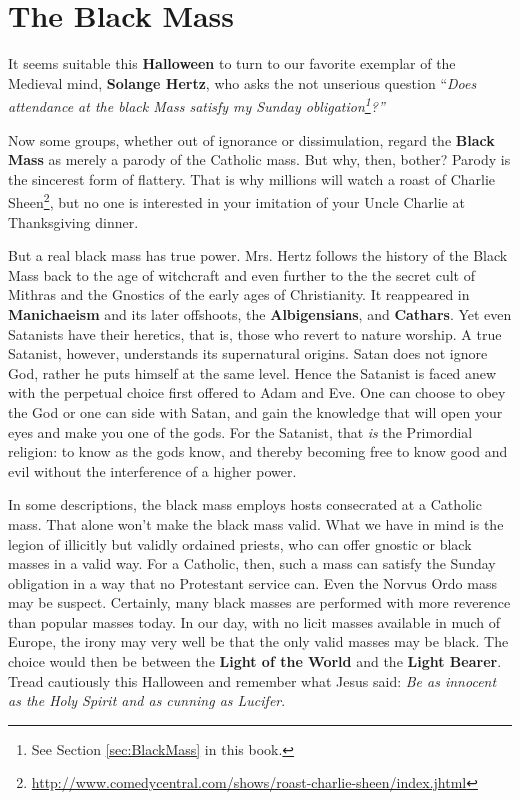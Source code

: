 \section{The Black Mass}

It seems suitable this \textbf{Halloween} to turn to our favorite exemplar of the Medieval mind, \textbf{Solange Hertz}, who asks the not unserious question ``\emph{Does attendance at the black Mass satisfy my Sunday obligation\footnote{See Section \ref{sec:BlackMass} in this book.}?''}

Now some groups, whether out of ignorance or dissimulation, regard the \textbf{Black Mass} as merely a parody of the Catholic mass. But why, then, bother? Parody is the sincerest form of flattery. That is why millions will watch a roast of Charlie Sheen\footnote{\url{http://www.comedycentral.com/shows/roast-charlie-sheen/index.jhtml}}, but no one is interested in your imitation of your Uncle Charlie at Thanksgiving dinner.

But a real black mass has true power. Mrs. Hertz follows the history of the Black Mass back to the age of witchcraft and even further to the the secret cult of Mithras and the Gnostics of the early ages of Christianity. It reappeared in \textbf{Manichaeism} and its later offshoots, the \textbf{Albigensians}, and \textbf{Cathars}. Yet even Satanists have their heretics, that is, those who revert to nature worship. A true Satanist, however, understands its supernatural origins. Satan does not ignore God, rather he puts himself at the same level. Hence the Satanist is faced anew with the perpetual choice first offered to Adam and Eve. One can choose to obey the God or one can side with Satan, and gain the knowledge that will open your eyes and make you one of the gods. For the Satanist, that \emph{is} the Primordial religion: to know as the gods know, and thereby becoming free to know good and evil without the interference of a higher power.

In some descriptions, the black mass employs hosts consecrated at a Catholic mass. That alone won't make the black mass valid. What we have in mind is the legion of illicitly but validly ordained priests, who can offer gnostic or black masses in a valid way. For a Catholic, then, such a mass can satisfy the Sunday obligation in a way that no Protestant service can. Even the Norvus Ordo mass may be suspect. Certainly, many black masses are performed with more reverence than popular masses today. In our day, with no licit masses available in much of Europe, the irony may very well be that the only valid masses may be black. The choice would then be between the \textbf{Light of the World} and the \textbf{Light Bearer}. Tread cautiously this Halloween and remember what Jesus said: \emph{Be as innocent as the Holy Spirit and as cunning as Lucifer}.

